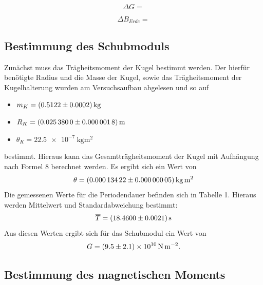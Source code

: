 \documentclass[11pt,ngerman,a4paper]{article}
\begin{document}
\[
\Delta G = 
\]

\[
\Delta B_{Erde}=
\]
\subsection{Bestimmung des Schubmoduls}
Zunächst muss das Trägheitsmoment der Kugel bestimmt werden. Der hierfür benötigte Radius und die Masse der Kugel, sowie das Trägheitsmoment der Kugelhalterung wurden am Versuchsaufbau abgelesen und so auf
\begin{itemize}
\item $m_K = \SI{0,5122+-0,0002}{\kilo\gram}$
\item $R_K =\SI{0.0253800+-0.0000018}{\metre}$
\item $\theta_K = \SI{22.5e-7}{\kilo\gram\meter\squared}$
\end{itemize}
bestimmt. Hieraus kann das Gesamtträgheitsmoment der Kugel mit Aufhängung nach Formel 8 berechnet werden. Es ergibt sich ein Wert von
\[
\theta = \SI{0.00013422+-0.00000005}{\kilo\gram\meter\squared}
\]
Die gemessenen Werte für die Periodendauer befinden sich in Tabelle 1. Hieraus werden Mittelwert und Standardabweichung bestimmt:
\[
\overline{T} = \SI{18.4600+-0.0021}{\second}
\]
Aus diesen Werten ergibt sich für das Schubmodul ein Wert von
\[
G = \SI{9.5+-2.1e+10}{\newton\per\meter\squared}.
\]

\subsection{Bestimmung des magnetischen Moments}
\end{document}
